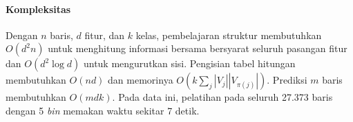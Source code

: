 \paragraph{Kompleksitas}
Dengan $n$ baris, $d$ fitur, dan $k$ kelas, pembelajaran struktur membutuhkan $O(d^2n)$ untuk menghitung informasi bersama bersyarat seluruh pasangan fitur dan $O(d^2\log d)$ untuk mengurutkan sisi. Pengisian tabel hitungan membutuhkan $O(nd)$ dan memorinya $O\left(k\sum_j|V_j||V_{\pi(j)}|\right)$. Prediksi $m$ baris membutuhkan $O(mdk)$. Pada data ini, pelatihan pada seluruh 27.373 baris dengan 5 \textit{bin} memakan waktu sekitar 7 detik.
